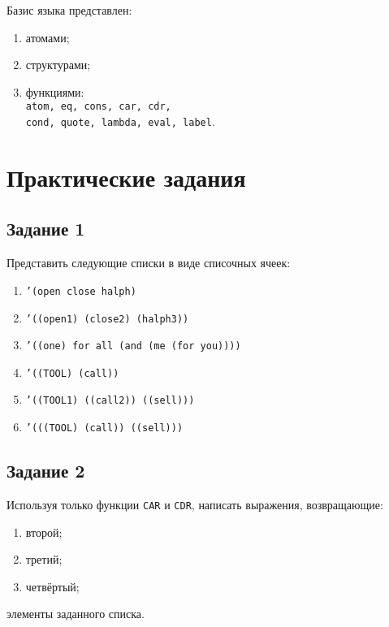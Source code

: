 Базис языка представлен:
\begin{enumerate}[label=\arabic*)]
	\item атомами;
	\item структурами;
	\item функциями:\\
	{\texttt{atom, eq, cons, car, cdr,}}\\
	{\texttt{cond, quote, lambda, eval, label}}.
\end{enumerate}

\chapter{Практические задания}

\section*{Задание 1}
Представить следующие списки в виде списочных ячеек:
\begin{enumerate}[label=\arabic*)]
	\item \texttt{'(open close halph)}
	\item \texttt{'((open1) (close2) (halph3))}
	\item \texttt{'((one) for all (and (me (for you))))}
	\item \texttt{'((TOOL) (call))}
	\item \texttt{'((TOOL1) ((call2)) ((sell)))}
	\item \texttt{'(((TOOL) (call)) ((sell)))}
\end{enumerate}

\clearpage
{}

\section*{Задание 2}
Используя только функции \texttt{CAR} и \texttt{CDR},  написать выражения, возвращающие:
\begin{enumerate}[label=\arabic*)]
	\item второй;
	\item третий;
	\item четвёртый;
\end{enumerate}
элементы заданного списка.


